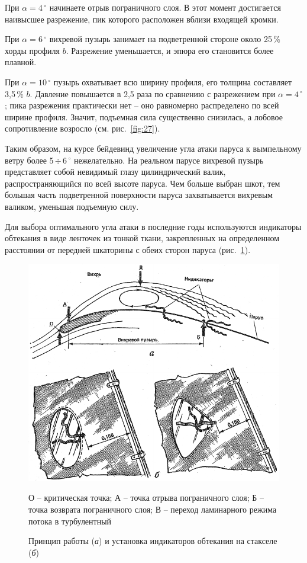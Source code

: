 \documentclass[a4paper, 12pt, twoside, final, book, russian, fittopage, cyremdash]{ncc}
\newcommand{\gr}{\ensuremath{\,^\circ}\xspace}
\newcommand{\otdo}{\,\ensuremath{\div}\,}
\newcommand{\ris}[1]{\ref{fig:#1}}
\begin{document}
При $\alpha = 4\gr$ начинаете отрыв пограничного слоя. В этот момент достигается наивысшее разрежение, пик которого расположен вблизи входящей кромки.
 
При $\alpha = 6\gr$ вихревой пузырь занимает на подветренной стороне около 25\,\% хорды профиля $b$. Разрежение уменьшается, и эпюра его становится более плавной. 

При $\alpha = 10\gr$ пузырь охватывает всю ширину профиля, его толщина составляет 3,5\,\% $b$. Давление повышается в 2,5 раза по сравнению с разрежением при $\alpha = 4\gr$; пика разрежения практически нет \--- оно равномерно распределено по всей ширине профиля. Значит, подъемная сила существенно снизилась, а лобовое сопротивление возросло (см. рис.~\ris{27}). 

Таким образом, на курсе бейдевинд увеличение угла атаки паруса к вымпельному ветру более 5\otdo 6\gr нежелательно. На реальном парусе вихревой пузырь представляет собой невидимый глазу цилиндрический валик, распространяющийся по всей высоте паруса. Чем больше выбран шкот, тем большая часть подветренной поверхности паруса захватывается вихревым валиком, уменьшая подъемную силу. 

Для выбора оптимального угла атаки в последние годы используются индикаторы обтекания в виде ленточек из тонкой ткани, закрепленных на определенном расстоянии от передней шкаторины с обеих сторон паруса (рис.~\ris{22}).

\begin{figure}[htb]
  \centering
  \includegraphics[scale=1.3]{0022P}
  \caption{Принцип работы (\textit{а}) и установка индикаторов обтекания на стакселе (\textit{б})}
  \label{fig:22}
  \small
  \centering{}
  О \--- критическая точка; А \--- точка отрыва пограничного слоя; Б \--- точка возврата пограничного слоя; В \--- переход ламинарного режима потока в турбулентный
\end{figure}
\end{document}

